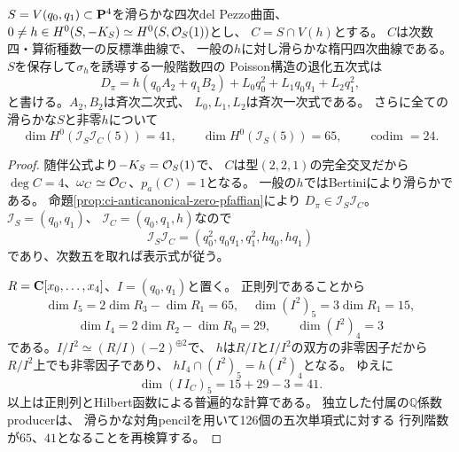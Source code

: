 \begin{theorem}
\label{thm:dp-24-pfaffian-conditions}
$S=V(q_0,q_1)\subset\mathbf P^4$を滑らかな四次del Pezzo曲面、
$0\ne h\in H^0(S,-K_S)\simeq H^0(S,\mathcal O_S(1))$とし、
$C=S\cap V(h)$とする。
$C$は次数四・算術種数一の反標準曲線で、
一般の$h$に対し滑らかな楕円四次曲線である。
$S$を保存して$\sigma_h$を誘導する一般階数四の
Poisson構造の退化五次式は
\begin{equation}\label{eq:dp-pfaffian-expansion}
 \boxed{\quad
 D_\pi=h(q_0A_2+q_1B_2)
       +L_0q_0^2+L_1q_0q_1+L_2q_1^2,\quad}
\end{equation}
と書ける。$A_2,B_2$は斉次二次式、
$L_0,L_1,L_2$は斉次一次式である。
さらに全ての滑らかな$S$と非零$h$について
\begin{equation}\label{eq:dp-pfaffian-dimension41}
 \boxed{\quad
 \dim H^0(\mathcal I_S\mathcal I_C(5))=41,\qquad
 \dim H^0(\mathcal I_S(5))=65,\qquad
 \operatorname{codim}=24.\quad}
\end{equation}
\end{theorem}
\begin{proof}
随伴公式より$-K_S=\mathcal O_S(1)$で、
$C$は型$(2,2,1)$の完全交叉だから
$\deg C=4$、$\omega_C\simeq\mathcal O_C$、$p_a(C)=1$となる。
一般の$h$ではBertiniにより滑らかである。
命題\ref{prop:ci-anticanonical-zero-pfaffian}により
$D_\pi\in\mathcal I_S\mathcal I_C$。
$\mathcal I_S=(q_0,q_1)$、
$\mathcal I_C=(q_0,q_1,h)$なので
\[
 \mathcal I_S\mathcal I_C
 =(q_0^2,q_0q_1,q_1^2,hq_0,hq_1)
\]
であり、次数五を取れば表示式が従う。

$R=\mathbf C[x_0,\ldots,x_4]$、$I=(q_0,q_1)$と置く。
正則列であることから
\[
\dim I_5=2\dim R_3-\dim R_1=65,\quad
\dim(I^2)_5=3\dim R_1=15,
\]
\[
 \dim I_4=2\dim R_2-\dim R_0=29,\qquad
 \dim(I^2)_4=3
\]
である。$I/I^2\simeq(R/I)(-2)^{\oplus2}$で、
$h$は$R/I$と$I/I^2$の双方の非零因子だから
$R/I^2$上でも非零因子であり、
$hI_4\cap(I^2)_5=h(I^2)_4$となる。
ゆえに
\[
 \dim(I\,I_C)_5=15+29-3=41.
\]
以上は正則列とHilbert函数による普遍的な計算である。
独立した付属の$\mathbb Q$係数producerは、
滑らかな対角pencilを用いて126個の五次単項式に対する
行列階数が$65$、$41$となることを再検算する。
\end{proof}


